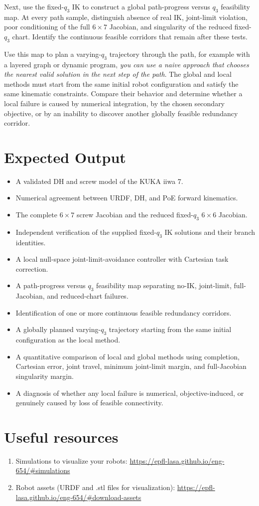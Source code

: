 \documentclass[11pt,a4paper]{article}
\begin{document}
Next, use the fixed-$q_3$ IK to construct a global path-progress versus $q_3$ feasibility map. At every path sample, distinguish absence of real IK, joint-limit violation, poor conditioning of the full $6\times7$ Jacobian, and singularity of the reduced fixed-$q_3$ chart. Identify the continuous feasible corridors that remain after these tests.

Use this map to plan a varying-$q_3$ trajectory through the path, for example with a layered graph or dynamic program, \textit{you can use a naive approach that chooses the nearest valid solution in the next step of the path}. The global and local methods must start from the same initial robot configuration and satisfy the same kinematic constraints. Compare their behavior and determine whether a local failure is caused by numerical integration, by the chosen secondary objective, or by an inability to discover another globally feasible redundancy corridor.

\section*{Expected Output}
\begin{itemize}
  \item A validated DH and screw model of the KUKA iiwa 7.
  \item Numerical agreement between URDF, DH, and PoE forward kinematics.
  \item The complete $6\times7$ screw Jacobian and the reduced fixed-$q_3$ $6\times6$ Jacobian.
  \item Independent verification of the supplied fixed-$q_3$ IK solutions and their branch identities.
  \item A local null-space joint-limit-avoidance controller with Cartesian task correction.
  \item A path-progress versus $q_3$ feasibility map separating no-IK, joint-limit, full-Jacobian, and reduced-chart failures.
  \item Identification of one or more continuous feasible redundancy corridors.
  \item A globally planned varying-$q_3$ trajectory starting from the same initial configuration as the local method.
  \item A quantitative comparison of local and global methods using completion, Cartesian error, joint travel, minimum joint-limit margin, and full-Jacobian singularity margin.
  \item A diagnosis of whether any local failure is numerical, objective-induced, or genuinely caused by loss of feasible connectivity.
\end{itemize}

\section*{Useful resources}
\begin{enumerate}
	\item Simulations to visualize your robots: \url{https://epfl-lasa.github.io/eng-654/#simulations} 
	\item Robot assets (URDF and .stl files for visualization): \url{https://epfl-lasa.github.io/eng-654/#download-assets}
\end{enumerate}
\end{document}
